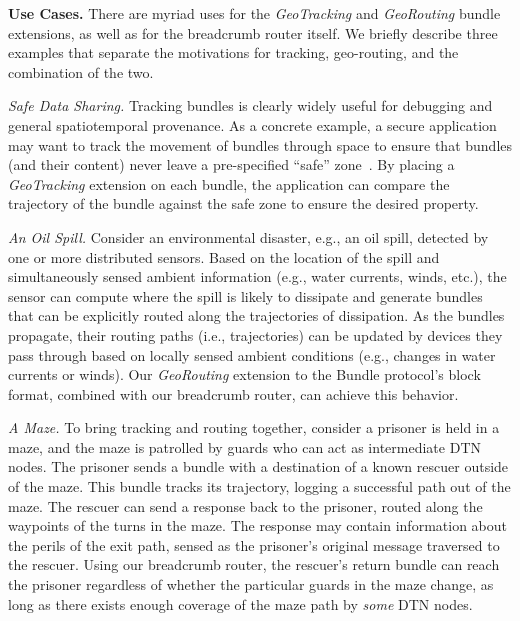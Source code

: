 %
%

{\bf Use Cases.} There are myriad uses for the {\em GeoTracking} and
{\em GeoRouting} bundle extensions, as well as for the {\sc
  breadcrumb} router itself. We briefly describe three examples that
separate the motivations for tracking, geo-routing, and the
combination of the two.

{\it Safe Data Sharing.} Tracking bundles is clearly widely useful for
debugging and general spatiotemporal provenance. As a concrete
example, a secure application may want to track the movement of
bundles through space to ensure that bundles (and their content) never
leave a pre-specified ``safe'' zone~\cite{michel12:spatiotemporal}. By
placing a {\em GeoTracking} extension on each bundle, the application
can compare the trajectory of the bundle against the safe zone to
ensure the desired property.

{\it An Oil Spill.} Consider an environmental disaster, e.g., an oil
spill, detected by one or more distributed sensors. Based on the
location of the spill and simultaneously sensed ambient information
(e.g., water currents, winds, etc.), the sensor can compute where the
spill is likely to dissipate and generate bundles that can be
explicitly routed along the trajectories of dissipation. As the
bundles propagate, their routing paths (i.e., trajectories) can be
updated by devices they pass through based on locally sensed ambient
conditions (e.g., changes in water currents or winds). Our {\em
  GeoRouting} extension to the Bundle protocol's block format,
combined with our {\sc breadcrumb} router, can achieve this behavior.

{\it A Maze.} To bring tracking and routing together, consider a
prisoner is held in a maze, and the maze is patrolled by guards who
can act as intermediate DTN nodes. The prisoner sends a bundle with a
destination of a known rescuer outside of the maze. This bundle tracks
its trajectory, logging a successful path out of the maze. The rescuer
can send a response back to the prisoner, routed along the waypoints
of the turns in the maze. The response may contain information about
the perils of the exit path, sensed as the prisoner's original message
traversed to the rescuer. Using our {\sc breadcrumb} router, the
rescuer's return bundle can reach the prisoner regardless of whether
the particular guards in the maze change, as long as there exists
enough coverage of the maze path by {\em some} DTN nodes.






